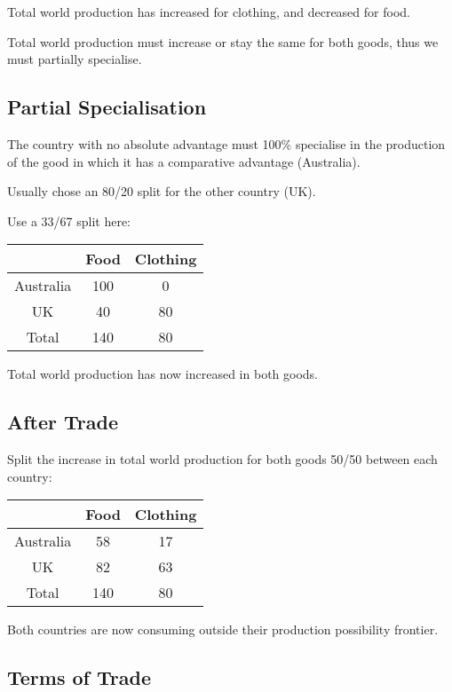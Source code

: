 \documentclass[a4paper,11pt]{article}
\begin{document}
Total world production has increased for clothing, and decreased for food.

Total world production must increase or stay the same for both goods, thus we
must partially specialise.


\subsection{Partial Specialisation}

The country with no absolute advantage must 100\% specialise in the production
of the good in which it has a comparative advantage (Australia).

Usually chose an 80/20 split for the other country (UK).

Use a 33/67 split here:

\begin{center}
\begin{tabular}{c|c|c}
& Food & Clothing \\
\hline
Australia & 100 & 0  \\
UK        & 40  & 80 \\
Total     & 140 & 80 \\
\end{tabular}
\end{center}

Total world production has now increased in both goods.


\subsection{After Trade}

Split the increase in total world production for both goods 50/50 between each
country:

\begin{center}
\begin{tabular}{c|c|c}
& Food & Clothing \\
\hline
Australia & 58  & 17 \\
UK        & 82  & 63 \\
Total     & 140 & 80 \\
\end{tabular}
\end{center}

Both countries are now consuming outside their production possibility frontier.


\subsection{Terms of Trade}
\end{document}
